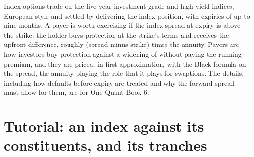 Index options trade on the five-year investment-grade and high-yield indices, European
style and settled by delivering the index position, with expiries of up to nine
months. A payer is worth exercising if the index spread at expiry is above the strike:
the holder buys protection at the strike's terms and receives the upfront difference,
roughly (spread minus strike) times the annuity. Payers are how investors buy
protection against a widening of  without paying the running premium,
and they are priced, in first approximation, with the Black formula on the spread,
the annuity playing the role that it plays for swaptions. The details, including how
defaults before expiry are treated and why the forward spread must allow for them, are
for One Quant Book 6.

\section{Tutorial: an index against its constituents, and its tranches}\label{tut:m2:credit-indices-and-tranches:tranche}

